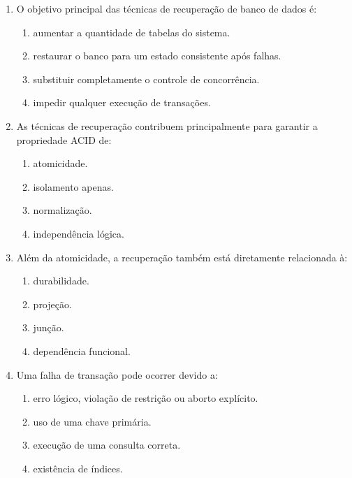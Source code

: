 \documentclass[12pt,a4paper]{article}
\begin{document}
\begin{enumerate}[label=\textbf{Q\arabic*.}]

\item O objetivo principal das técnicas de recuperação de banco de dados é:

\begin{enumerate}[label=\alph*)]
    \item aumentar a quantidade de tabelas do sistema.
    \item restaurar o banco para um estado consistente após falhas.
    \item substituir completamente o controle de concorrência.
    \item impedir qualquer execução de transações.
\end{enumerate}

\item As técnicas de recuperação contribuem principalmente para garantir a propriedade ACID de:

\begin{enumerate}[label=\alph*)]
    \item atomicidade.
    \item isolamento apenas.
    \item normalização.
    \item independência lógica.
\end{enumerate}

\item Além da atomicidade, a recuperação também está diretamente relacionada à:

\begin{enumerate}[label=\alph*)]
    \item durabilidade.
    \item projeção.
    \item junção.
    \item dependência funcional.
\end{enumerate}

\item Uma falha de transação pode ocorrer devido a:

\begin{enumerate}[label=\alph*)]
    \item erro lógico, violação de restrição ou aborto explícito.
    \item uso de uma chave primária.
    \item execução de uma consulta correta.
    \item existência de índices.
\end{enumerate}


\end{enumerate}
\end{document}
